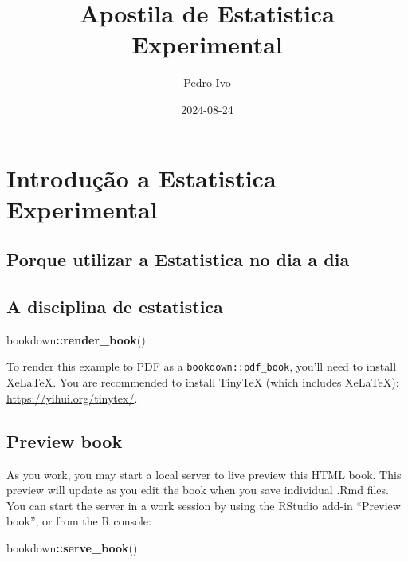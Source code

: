 \documentclass[
]{book}
\title{Apostila de Estatistica Experimental}
\author{Pedro Ivo}
\date{2024-08-24}
\newenvironment{Shaded}{\begin{snugshade}}{\end{snugshade}}
\newcommand{\FunctionTok}[1]{\textcolor[rgb]{0.13,0.29,0.53}{\textbf{#1}}}
\newcommand{\NormalTok}[1]{#1}
\newcommand{\SpecialCharTok}[1]{\textcolor[rgb]{0.81,0.36,0.00}{\textbf{#1}}}
\begin{document}
\maketitle

{
\setcounter{tocdepth}{1}
\tableofcontents
}
\chapter{Introdução a Estatistica Experimental}\label{introduuxe7uxe3o-a-estatistica-experimental}

\section{Porque utilizar a Estatistica no dia a dia}\label{porque-utilizar-a-estatistica-no-dia-a-dia}

\section{A disciplina de estatistica}\label{a-disciplina-de-estatistica}

\begin{Shaded}
\begin{Highlighting}[]
\NormalTok{bookdown}\SpecialCharTok{::}\FunctionTok{render\_book}\NormalTok{()}
\end{Highlighting}
\end{Shaded}

To render this example to PDF as a \texttt{bookdown::pdf\_book}, you'll need to install XeLaTeX. You are recommended to install TinyTeX (which includes XeLaTeX): \url{https://yihui.org/tinytex/}.

\section{Preview book}\label{preview-book}

As you work, you may start a local server to live preview this HTML book. This preview will update as you edit the book when you save individual .Rmd files. You can start the server in a work session by using the RStudio add-in ``Preview book'', or from the R console:

\begin{Shaded}
\begin{Highlighting}[]
\NormalTok{bookdown}\SpecialCharTok{::}\FunctionTok{serve\_book}\NormalTok{()}
\end{Highlighting}
\end{Shaded}
\end{document}
